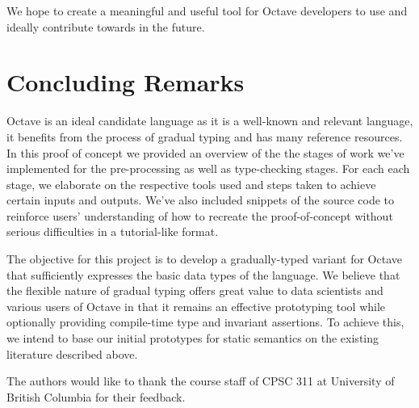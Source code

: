We hope to create a meaningful and useful tool for Octave developers to use and ideally contribute towards in the future.

\section{Concluding Remarks}
Octave is an ideal candidate language as it is a well-known and relevant language, it benefits from the process of gradual typing and has many reference resources. In this proof of concept we provided an overview of the the stages of work we've implemented for the pre-processing as well as type-checking stages. For each each stage, we elaborate on the respective tools used and steps taken to achieve certain inputs and outputs. We've also included snippets of the source code to reinforce users' understanding of how to recreate the proof-of-concept without serious difficulties in a tutorial-like format.

The objective for this project is to develop a gradually-typed variant for Octave that sufficiently expresses the basic data types of the language. We believe that the flexible nature of gradual typing offers great value to data scientists and various users of Octave in that it remains an effective prototyping tool while optionally providing compile-time type and invariant assertions. To achieve this, we intend to base our initial prototypes for static semantics on the existing literature described above.

\appendix

\begin{acks}
    The authors would like to thank the course staff of CPSC 311 at University
    of British Columbia for their feedback.
\end{acks}
